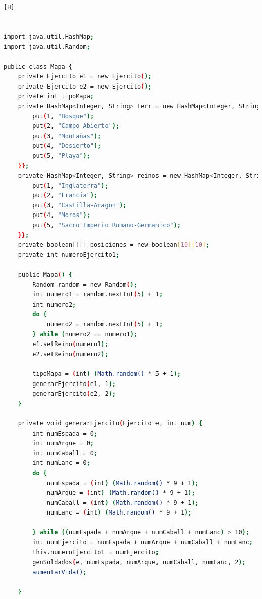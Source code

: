 \documentclass{article}
\begin{document}
	\begin{lstlisting}[language=bash,caption={CLASE Mapa}][H]
	

import java.util.HashMap;
import java.util.Random;

public class Mapa {
    private Ejercito e1 = new Ejercito();
    private Ejercito e2 = new Ejercito();
    private int tipoMapa;
    private HashMap<Integer, String> terr = new HashMap<Integer, String>() {{
        put(1, "Bosque");
        put(2, "Campo Abierto");
        put(3, "Montañas");
        put(4, "Desierto");
        put(5, "Playa");
    }};
    private HashMap<Integer, String> reinos = new HashMap<Integer, String>() {{
        put(1, "Inglaterra");
        put(2, "Francia");
        put(3, "Castilla-Aragon");
        put(4, "Moros");
        put(5, "Sacro Imperio Romano-Germanico");
    }};
    private boolean[][] posiciones = new boolean[10][10];
    private int numeroEjercito1;

    public Mapa() {
        Random random = new Random();
        int numero1 = random.nextInt(5) + 1;
        int numero2;
        do {
            numero2 = random.nextInt(5) + 1;
        } while (numero2 == numero1);
        e1.setReino(numero1);
        e2.setReino(numero2);

        tipoMapa = (int) (Math.random() * 5 + 1);
        generarEjercito(e1, 1);
        generarEjercito(e2, 2);
    }

    private void generarEjercito(Ejercito e, int num) {
        int numEspada = 0;
        int numArque = 0;
        int numCaball = 0;
        int numLanc = 0;
        do {
            numEspada = (int) (Math.random() * 9 + 1);
            numArque = (int) (Math.random() * 9 + 1);
            numCaball = (int) (Math.random() * 9 + 1);
            numLanc = (int) (Math.random() * 9 + 1);

        } while ((numEspada + numArque + numCaball + numLanc) > 10);
        int numEjercito = numEspada + numArque + numCaball + numLanc;
        this.numeroEjercito1 = numEjercito;
        genSoldados(e, numEspada, numArque, numCaball, numLanc, 2);
        aumentarVida();

    }


\end{lstlisting}
\end{document}
